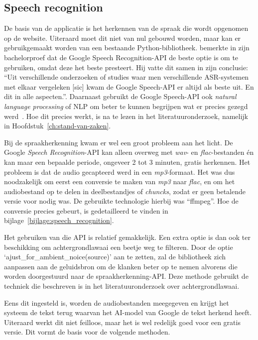 \subsection{Speech recognition}
De basis van de applicatie is het herkennen van de spraak die wordt opgenomen op de website. Uiteraard moet dit niet van nul gebouwd worden, maar kan er gebruikgemaakt worden van een bestaande Python-bibliotheek. \textcite{Standaert2021} bemerkte in zijn bachelorproef dat  de Google Speech Recognition-API de beste optie is om te gebruiken, omdat deze het beste presteert. Hij vatte dit samen in zijn conclusie: ``Uit verschillende onderzoeken of studies waar men verschillende ASR-systemen met elkaar vergeleken [sic] kwam de Google Speech-API er altijd als beste uit. En dit in alle aspecten.''. Daarnaast gebruikt de Google Speech-API ook \textit{natural language processing} of NLP om beter te kunnen begrijpen wat er precies gezegd werd~\autocite{GoogleCloud2022}. Hoe dit precies werkt, is na te lezen in het literatuuronderzoek, namelijk in Hoofdstuk~\ref{ch:stand-van-zaken}.

Bij de spraakherkenning kwam er wel een groot probleem aan het licht. De Google \textit{Speech Recognition}-API kan alleen overweg met \textit{wav}- en \textit{flac}-bestanden én kan maar een bepaalde periode, ongeveer 2 tot 3 minuten, gratis herkennen. Het probleem is dat de audio gecapteerd werd in een \textit{mp3}-formaat. Het was dus noodzakelijk om eerst een conversie te maken van \textit{mp3} naar \textit{flac}, en om het audiobestand op te delen in deelbestandjes of \textit{chuncks}, zodat er geen betalende versie voor nodig was. De gebruikte technologie hierbij was ``ffmpeg''. Hoe de conversie precies gebeurt, is gedetailleerd te vinden in bijlage~\ref{bijlage:speech_recognition}.

Het gebruiken van die API is relatief gemakkelijk. Een extra optie is dan ook ter beschikking om achtergrondlawaai een beetje weg te filteren. Door de optie \newline`ajust\_for\_ambient\_noice(source)' aan te zetten, zal de bibliotheek zich aanpassen aan de geluidsbron om de klanken beter op te nemen alvorens die worden doorgestuurd naar de spraakherkenning-API. Deze methode gebruikt de techniek die beschreven is in het literatuuronderzoek over achtergrondlawaai.

Eens dit ingesteld is, worden de audiobestanden meegegeven en krijgt het systeem de tekst terug waarvan het AI-model van Google de tekst herkend heeft. Uiteraard werkt dit niet feilloos, maar het is wel redelijk goed voor een gratis versie. Dit vormt de basis voor de volgende methoden.


